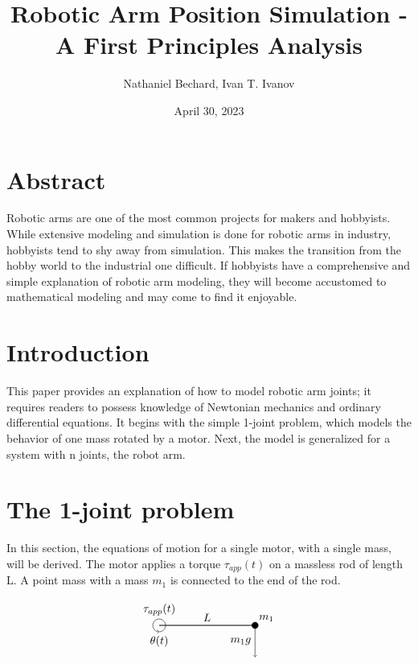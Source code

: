 \documentclass{article}
\title{Robotic Arm Position Simulation - A First Principles Analysis}
\author{Nathaniel Bechard, Ivan T. Ivanov}
\date{April 30, 2023}
\begin{document}
\maketitle
\tableofcontents %

\section{Abstract}
Robotic arms are one of the most common projects for makers and hobbyists. While extensive modeling and simulation is done for robotic arms in industry, hobbyists tend to shy away from simulation. This makes the transition from the hobby world to the industrial one difficult. If hobbyists have a comprehensive and simple explanation of robotic arm modeling, they will become accustomed to mathematical modeling and may come to find it enjoyable. 

\newpage

\section{Introduction}
This paper provides an explanation of how to model robotic arm joints; it requires readers to possess knowledge of Newtonian mechanics and ordinary differential equations. It begins with the simple 1-joint problem, which models the behavior of one mass rotated by a motor. Next, the model is generalized for a system with n joints, the robot arm.

\section{The 1-joint problem}
In this section, the equations of motion for a single motor, with a single mass, will be derived. The motor applies a torque $\tau_{app}(t)$ on a massless rod of length L. A point mass with a mass $m_1$ is connected to the end of the rod. 

\vspace{24pt}

\[\begin{tikzpicture}
  \draw[->] (0, -0.2) arc (-90:270:0.2cm);
  \draw (0, 0.5) node {$\tau_{app}(t)$};
  \draw (0, -0.5) node {$\theta(t)$};
  
  \draw[thick] (0,0) -- (3,0);
  \draw (1.5,0) node[anchor=south] {$L$};
  
  \filldraw (3,0) circle (0.1cm);
  \draw (3,0) node[anchor=south west] {$m_1$};

  \draw[->] (3,0) -- (3, -1);
  \draw (3,-0.5) node[anchor=east] {$m_1g$};

\end{tikzpicture}\]
\end{document}
